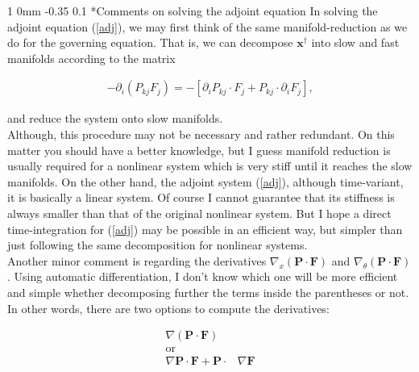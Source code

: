\documentclass[11pt]{article}
\makeatletter
\renewcommand{\subsection}{\@startsection
{subsection}%
{1}%
{0mm}%
{-0.35\baselineskip}%
{0.1\baselineskip}%
{\normalfont\large\bfseries\color{brown}}}%
\newcommand\eqsp[2]{
\begin{equation#1}
\begin{split}
#2
\end{split}
\end{equation#1}
}
\newcommand{\bx}{\mathbf{x}}
\newcommand{\bP}{\mathbf{P}}
\newcommand{\bF}{\mathbf{F}}
\makeatother
\begin{document}
\subsection*{Comments on solving the adjoint equation}
In solving the adjoint equation (\ref{adj}), we may first think of the same manifold-reduction as we do for the governing equation.
That is, we can decompose $\bx^{\dagger}$ into slow and fast manifolds according to the matrix
\eqsp{*}{
- \partial_i\left( P_{kj}F_j \right) = - \left[ \partial_iP_{kj}\cdot F_j + P_{kj}\cdot\partial_iF_j \right],
}
and reduce the system onto slow manifolds.\\
Although, this procedure may not be necessary and rather redundant.
On this matter you should have a better knowledge,
but I guess manifold reduction is usually required for a nonlinear system which is very stiff until it reaches the slow manifolds.
On the other hand, the adjoint system (\ref{adj}), although time-variant,
it is basically a linear system.
Of course I cannot guarantee that its stiffness is always smaller than that of the original nonlinear system.
But I hope a direct time-integration for (\ref{adj}) may be possible in an efficient way,
but simpler than just following the same decomposition for nonlinear systems.\\
Another minor comment is regarding the derivatives $\nabla_x(\bP\cdot\bF)$ and $\nabla_{\theta}(\bP\cdot\bF)$. 
Using automatic differentiation, I don't know which one will be more efficient and simple
whether decomposing further the terms inside the parentheses or not.
In other words, there are two options to compute the derivatives:
\eqsp{*}{
\nabla(\bP\cdot\bF)\\
\text{or}\qquad\\
\nabla\bP\cdot\bF + \bP\cdot&\nabla\bF
}
\end{document}
